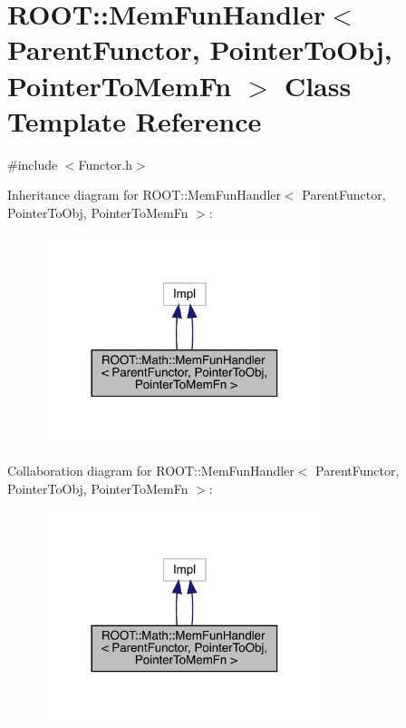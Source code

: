 \hypertarget{classROOT_1_1Math_1_1MemFunHandler}{}\section{R\+O\+OT\+:\+:Mem\+Fun\+Handler$<$ Parent\+Functor, Pointer\+To\+Obj, Pointer\+To\+Mem\+Fn $>$ Class Template Reference}
\label{classROOT_1_1Math_1_1MemFunHandler}


{\ttfamily \#include $<$Functor.\+h$>$}



Inheritance diagram for R\+O\+OT\+:\+:Mem\+Fun\+Handler$<$ Parent\+Functor, Pointer\+To\+Obj, Pointer\+To\+Mem\+Fn $>$\+:\nopagebreak
\begin{figure}[H]
\begin{center}
\leavevmode
\includegraphics[width=234pt]{d3/d37/classROOT_1_1Math_1_1MemFunHandler__inherit__graph}
\end{center}
\end{figure}


Collaboration diagram for R\+O\+OT\+:\+:Mem\+Fun\+Handler$<$ Parent\+Functor, Pointer\+To\+Obj, Pointer\+To\+Mem\+Fn $>$\+:\nopagebreak
\begin{figure}[H]
\begin{center}
\leavevmode
\includegraphics[width=234pt]{df/dd0/classROOT_1_1Math_1_1MemFunHandler__coll__graph}
\end{center}
\end{figure}
